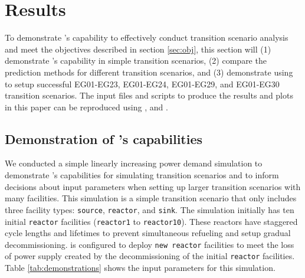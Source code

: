 \section{Results}
To demonstrate \deploy's capability to effectively conduct transition
scenario analysis and meet the objectives described in section 
\ref{sec:obj}, this section will 
(1) demonstrate \deploy's capability in simple transition scenarios, 
(2) compare the prediction methods for different transition scenarios, and
(3) demonstrate using \deploy to setup successful EG01-EG23, EG01-EG24, 
EG01-EG29, and EG01-EG30 transition scenarios. 
The input files and scripts to produce the results and plots in this
paper can be reproduced using \cite{noauthor_arfc/d3ploy:_2019}, and 
\cite{chee_arfc/transition-scenarios_2018}. 

\subsection{Demonstration of \deploy's capabilities}
\label{sec:demo}
We conducted a simple linearly increasing power demand simulation 
to demonstrate \deploy's capabilities for 
simulating transition scenarios and to inform decisions about 
input parameters when setting up larger transition scenarios 
with many facilities.
This simulation is a simple transition scenario that only includes
three facility types: \texttt{source}, \texttt{reactor}, and 
\texttt{sink}. 
The simulation initially has ten initial \texttt{reactor} facilities 
(\texttt{reactor1} to \texttt{reactor10}). 
These reactors have staggered cycle lengths and lifetimes to prevent 
simultaneous refueling and setup gradual decommissioning. 
\deploy is configured to deploy \texttt{new reactor} facilities
to meet the loss of power supply created by the decommissioning 
of the initial \texttt{reactor} facilities. 
Table \ref{tab:demonstrations} shows the \deploy input parameters 
for this simulation.  

